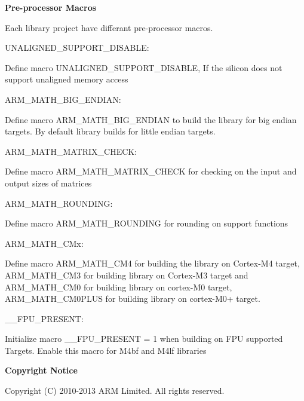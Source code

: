 {\bfseries{Pre-\/processor Macros}}

Each library project have differant pre-\/processor macros.


\begin{DoxyItemize}
\item U\+N\+A\+L\+I\+G\+N\+E\+D\+\_\+\+S\+U\+P\+P\+O\+R\+T\+\_\+\+D\+I\+S\+A\+B\+LE\+:
\end{DoxyItemize}

Define macro U\+N\+A\+L\+I\+G\+N\+E\+D\+\_\+\+S\+U\+P\+P\+O\+R\+T\+\_\+\+D\+I\+S\+A\+B\+LE, If the silicon does not support unaligned memory access


\begin{DoxyItemize}
\item A\+R\+M\+\_\+\+M\+A\+T\+H\+\_\+\+B\+I\+G\+\_\+\+E\+N\+D\+I\+AN\+:
\end{DoxyItemize}

Define macro A\+R\+M\+\_\+\+M\+A\+T\+H\+\_\+\+B\+I\+G\+\_\+\+E\+N\+D\+I\+AN to build the library for big endian targets. By default library builds for little endian targets.


\begin{DoxyItemize}
\item A\+R\+M\+\_\+\+M\+A\+T\+H\+\_\+\+M\+A\+T\+R\+I\+X\+\_\+\+C\+H\+E\+CK\+:
\end{DoxyItemize}

Define macro A\+R\+M\+\_\+\+M\+A\+T\+H\+\_\+\+M\+A\+T\+R\+I\+X\+\_\+\+C\+H\+E\+CK for checking on the input and output sizes of matrices


\begin{DoxyItemize}
\item A\+R\+M\+\_\+\+M\+A\+T\+H\+\_\+\+R\+O\+U\+N\+D\+I\+NG\+:
\end{DoxyItemize}

Define macro A\+R\+M\+\_\+\+M\+A\+T\+H\+\_\+\+R\+O\+U\+N\+D\+I\+NG for rounding on support functions


\begin{DoxyItemize}
\item A\+R\+M\+\_\+\+M\+A\+T\+H\+\_\+\+C\+Mx\+:
\end{DoxyItemize}

Define macro A\+R\+M\+\_\+\+M\+A\+T\+H\+\_\+\+C\+M4 for building the library on Cortex-\/\+M4 target, A\+R\+M\+\_\+\+M\+A\+T\+H\+\_\+\+C\+M3 for building library on Cortex-\/\+M3 target and A\+R\+M\+\_\+\+M\+A\+T\+H\+\_\+\+C\+M0 for building library on cortex-\/\+M0 target, A\+R\+M\+\_\+\+M\+A\+T\+H\+\_\+\+C\+M0\+P\+L\+US for building library on cortex-\/\+M0+ target.


\begin{DoxyItemize}
\item \+\_\+\+\_\+\+F\+P\+U\+\_\+\+P\+R\+E\+S\+E\+NT\+:
\end{DoxyItemize}

Initialize macro \+\_\+\+\_\+\+F\+P\+U\+\_\+\+P\+R\+E\+S\+E\+NT = 1 when building on F\+PU supported Targets. Enable this macro for M4bf and M4lf libraries

{\bfseries{Copyright Notice}}

Copyright (C) 2010-\/2013 A\+RM Limited. All rights reserved. 